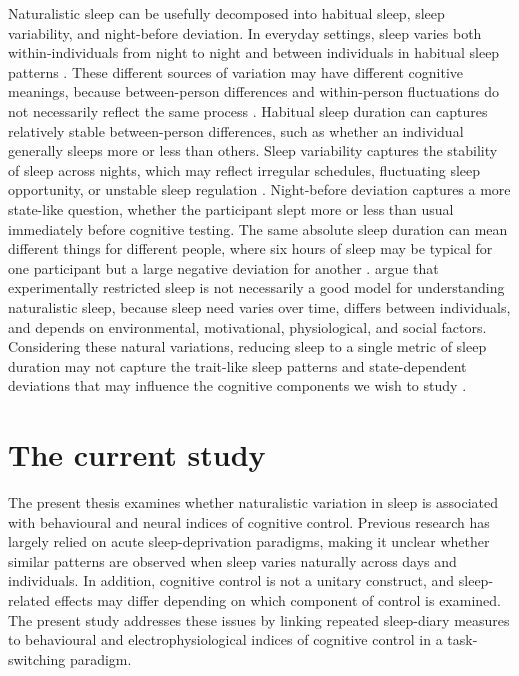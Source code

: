 \documentclass[12pt,a4paper]{report}
\begin{document}
Naturalistic sleep can be usefully decomposed into habitual sleep, sleep variability, and night-before deviation. In everyday settings, sleep varies both within-individuals from night to night and between individuals in habitual sleep patterns \parencite{bei2016sleepvariability,fjell2024sleep}. These different sources of variation may have different cognitive meanings, because between-person differences and within-person fluctuations do not necessarily reflect the same process \parencite{hamaker2015critique}. Habitual sleep duration can captures relatively stable between-person differences, such as whether an individual generally sleeps more or less than others. Sleep variability captures the stability of sleep across nights, which may reflect irregular schedules, fluctuating sleep opportunity, or unstable sleep regulation \parencite{bei2016sleepvariability}. Night-before deviation captures a more state-like question, whether the participant slept more or less than usual immediately before cognitive testing. The same absolute sleep duration can mean different things for different people, where six hours of sleep may be typical for one participant but a large negative deviation for another \parencite{fjell2024sleep,yu2022priornight}. \textcite{fjell2024sleep} argue that experimentally restricted sleep is not necessarily a good model for understanding naturalistic sleep, because sleep need varies over time, differs between individuals, and depends on environmental, motivational, physiological, and social factors. Considering these natural variations, reducing sleep to a single metric of sleep duration may not capture the trait-like sleep patterns and state-dependent deviations that may influence the cognitive components we wish to study \parencite{fjell2024sleep}. 


\section{The current study}

The present thesis examines whether naturalistic variation in sleep is associated with behavioural and neural indices of cognitive control. Previous research has largely relied on acute sleep-deprivation paradigms, making it unclear whether similar patterns are observed when sleep varies naturally across days and individuals. In addition, cognitive control is not a unitary construct, and sleep-related effects may differ depending on which component of control is examined. The present study addresses these issues by linking repeated sleep-diary measures to behavioural and electrophysiological indices of cognitive control in a task-switching paradigm.
\end{document}
